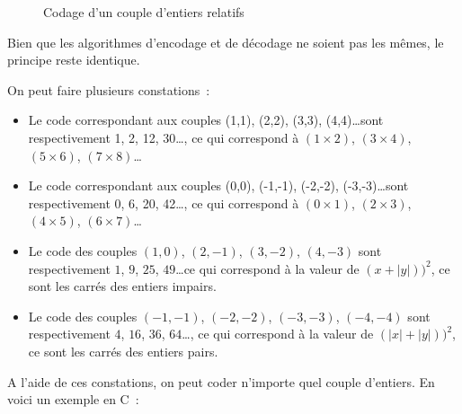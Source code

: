 \documentclass{article}
\begin{document}
\begin{figure}[ht!]
  \caption{Codage d'un couple d'entiers relatifs}
  \label{fig:codage-rel}
\end{figure}

Bien que les algorithmes d'encodage et de décodage ne soient pas les mêmes, le principe reste identique. 

On peut faire plusieurs constations~:

\begin{itemize}
\item Le code correspondant aux couples (1,1), (2,2), (3,3), (4,4)\ldots sont respectivement 1, 2, 12, 30\ldots, ce qui correspond à $(1 \times 2)$, $(3 \times 4)$, $(5 \times 6)$, $(7 \times 8)$\ldots
\item Le code correspondant aux couples (0,0), (-1,-1), (-2,-2), (-3,-3)\ldots sont respectivement 0, 6, 20, 42\ldots, ce qui correspond à $(0 \times 1)$, $(2 \times 3)$, $(4 \times 5)$, $(6 \times 7)$\ldots
\item Le code des couples $(1,0)$, $(2,-1)$, $(3,-2)$, $(4,-3)$ sont respectivement $1$, $9$, $25$, $49$\ldots ce qui correspond à la valeur de $(x + |y|))^{2}$, ce sont les carrés des entiers impairs.
\item Le code des couples $(-1,-1)$, $(-2,-2)$, $(-3,-3)$, $(-4,-4)$ sont respectivement $4$, $16$, $36$, $64$\ldots,  ce qui correspond à la valeur de $(|x| + |y|))^{2}$, ce sont les carrés des entiers pairs.
\end{itemize}


A l'aide de ces constations, on peut coder n'importe quel couple d'entiers. En voici un exemple en C~:
\end{document}
